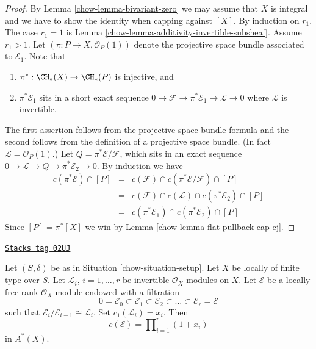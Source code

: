 \begin{proof}

By Lemma \ref{chow-lemma-bivariant-zero} we may assume that $X$ is integral
and we have to show the identity when capping against $[X]$.
By induction on $r_1$. The case $r_1 = 1$ is
Lemma \ref{chow-lemma-additivity-invertible-subsheaf}.
Assume $r_1 > 1$. Let $(\pi : P \to X, \mathcal{O}_P(1))$
denote the projective space bundle associated to $\mathcal{E}_1$. Note that
\begin{enumerate}
\item $\pi^* : \CH_*(X) \to \CH_*(P)$ is injective, and
\item $\pi^*\mathcal{E}_1$ sits in a short exact sequence
$0 \to \mathcal{F} \to \pi^*\mathcal{E}_1 \to \mathcal{L} \to 0$
where $\mathcal{L}$ is invertible.
\end{enumerate}
The first assertion follows from the projective space bundle formula
and the second follows from the definition of a projective space bundle.
(In fact $\mathcal{L} = \mathcal{O}_P(1)$.)
Let $Q = \pi^*\mathcal{E}/\mathcal{F}$, which sits in an
exact sequence $0 \to \mathcal{L} \to Q \to \pi^*\mathcal{E}_2 \to 0$.
By induction we have
\begin{eqnarray*}
c(\pi^*\mathcal{E}) \cap [P]
& = &
c(\mathcal{F}) \cap c(\pi^*\mathcal{E}/\mathcal{F}) \cap [P] \\
& = &
c(\mathcal{F}) \cap c(\mathcal{L}) \cap c(\pi^*\mathcal{E}_2) \cap [P] \\
& = &
c(\pi^*\mathcal{E}_1) \cap c(\pi^*\mathcal{E}_2) \cap [P]
\end{eqnarray*}
Since $[P] = \pi^*[X]$ we
win by Lemma \ref{chow-lemma-flat-pullback-cap-cj}.
\end{proof}

\begin{lemma}
\label{chow-lemma-chern-filter-by-linebundles}
\href{https://stacks.math.columbia.edu/tag/02UJ}{\texttt{Stacks tag 02UJ}}

Let $(S, \delta)$ be as in Situation \ref{chow-situation-setup}.
Let $X$ be locally of finite type over $S$.
Let ${\mathcal L}_i$, $i = 1, \ldots, r$ be invertible
$\mathcal{O}_X$-modules on $X$.
Let $\mathcal{E}$ be a locally free rank
$\mathcal{O}_X$-module endowed with a filtration
$$
0 = \mathcal{E}_0 \subset \mathcal{E}_1 \subset \mathcal{E}_2
\subset \ldots \subset \mathcal{E}_r = \mathcal{E}
$$
such that $\mathcal{E}_i/\mathcal{E}_{i - 1} \cong \mathcal{L}_i$.
Set $c_1({\mathcal L}_i) = x_i$. Then
$$
c(\mathcal{E})
=
\prod\nolimits_{i = 1}^r (1 + x_i)
$$
in $A^*(X)$.
\end{lemma}

